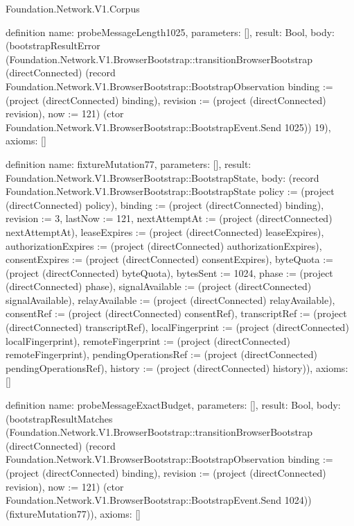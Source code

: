 \begin{lexlean}{Foundation.Network.V1.Corpus}
\begin{semanticmodule}
definition{
  name: probeMessageLength1025,
  parameters: [],
  result: Bool,
  body: (bootstrapResultError (Foundation.Network.V1.BrowserBootstrap::transitionBrowserBootstrap (directConnected) (record Foundation.Network.V1.BrowserBootstrap::BootstrapObservation {binding := (project (directConnected) binding), revision := (project (directConnected) revision), now := 121}) (ctor Foundation.Network.V1.BrowserBootstrap::BootstrapEvent.Send 1025)) 19),
  axioms: []
}

definition{
  name: fixtureMutation77,
  parameters: [],
  result: Foundation.Network.V1.BrowserBootstrap::BootstrapState,
  body: (record Foundation.Network.V1.BrowserBootstrap::BootstrapState {policy := (project (directConnected) policy), binding := (project (directConnected) binding), revision := 3, lastNow := 121, nextAttemptAt := (project (directConnected) nextAttemptAt), leaseExpires := (project (directConnected) leaseExpires), authorizationExpires := (project (directConnected) authorizationExpires), consentExpires := (project (directConnected) consentExpires), byteQuota := (project (directConnected) byteQuota), bytesSent := 1024, phase := (project (directConnected) phase), signalAvailable := (project (directConnected) signalAvailable), relayAvailable := (project (directConnected) relayAvailable), consentRef := (project (directConnected) consentRef), transcriptRef := (project (directConnected) transcriptRef), localFingerprint := (project (directConnected) localFingerprint), remoteFingerprint := (project (directConnected) remoteFingerprint), pendingOperationsRef := (project (directConnected) pendingOperationsRef), history := (project (directConnected) history)}),
  axioms: []
}

definition{
  name: probeMessageExactBudget,
  parameters: [],
  result: Bool,
  body: (bootstrapResultMatches (Foundation.Network.V1.BrowserBootstrap::transitionBrowserBootstrap (directConnected) (record Foundation.Network.V1.BrowserBootstrap::BootstrapObservation {binding := (project (directConnected) binding), revision := (project (directConnected) revision), now := 121}) (ctor Foundation.Network.V1.BrowserBootstrap::BootstrapEvent.Send 1024)) (fixtureMutation77)),
  axioms: []
}


\end{semanticmodule}
\end{lexlean}
